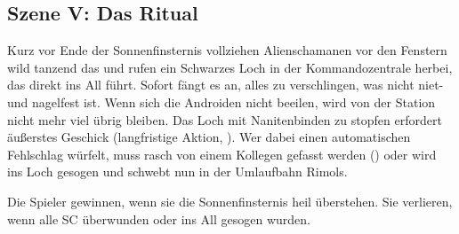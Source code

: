 {		\subsection{Szene V: Das Ritual}

		\noindent
		Kurz vor Ende der Sonnenfinsternis vollziehen Alienschamanen vor den Fenstern wild tanzend das  und rufen ein Schwarzes Loch in der Kommandozentrale herbei, das direkt ins All führt. Sofort fängt es an, alles zu verschlingen, was nicht niet- und nagelfest ist. Wenn sich die Androiden nicht beeilen, wird von der Station nicht mehr viel übrig bleiben. Das Loch mit Nanitenbinden zu stopfen erfordert äußerstes Geschick (langfristige Aktion, ). Wer dabei einen automatischen Fehlschlag würfelt, muss rasch von einem Kollegen gefasst werden () oder wird ins Loch gesogen und schwebt nun in der Umlaufbahn Rimols.


		\noindent
		Die Spieler gewinnen, wenn sie die Sonnenfinsternis heil überstehen. Sie verlieren, wenn alle SC überwunden oder ins All gesogen wurden.
}
